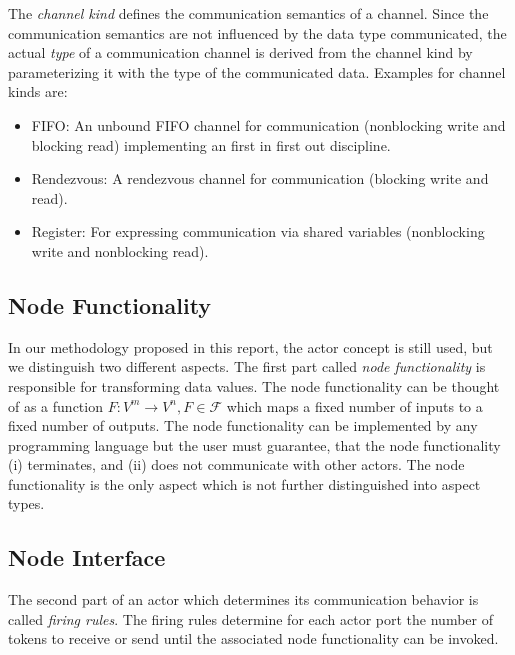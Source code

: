 The \emph{channel kind} defines the communication semantics of a channel.
Since the communication semantics are not influenced by the
data type communicated, the actual \emph{type} of a communication
channel is derived from the channel kind by parameterizing it with
the type of the communicated data. Examples for channel kinds are:

\begin{itemize}
\item \label{channel-kind-fifo} FIFO:
  An unbound FIFO channel for communication
  (nonblocking write and blocking read) implementing
  an first in first out discipline.

\item \label{channel-kind-rendezvous} Rendezvous:
  A rendezvous channel for communication %
  (blocking write and read).

\item \label{channel-kind-register} Register:
  For expressing communication via shared variables
  (nonblocking write and nonblocking read).
\end{itemize}

\subsection{Node Functionality}\label{node-functionality}

In our methodology proposed in this report, the actor concept is still used,
but we distinguish two different aspects.
The first part called \emph{node functionality} is responsible
for transforming data values. The node functionality can be
thought of as a function $F: V^{m} \to V^{n}, F \in \mathcal{F}$  which maps a fixed
number of inputs to a fixed number of outputs. The node functionality
can be implemented by any programming language but
the user must guarantee, that the node functionality (i) terminates,
and (ii) does not communicate with other actors.
The node functionality is the only aspect which is not
further distinguished into aspect types.

\subsection{Node Interface}\label{node-interface}

The second part of an actor which determines its communication
behavior is called \emph{firing rules}. The firing rules
determine for each actor port the number of tokens to receive or send
until the associated node functionality can be invoked.

